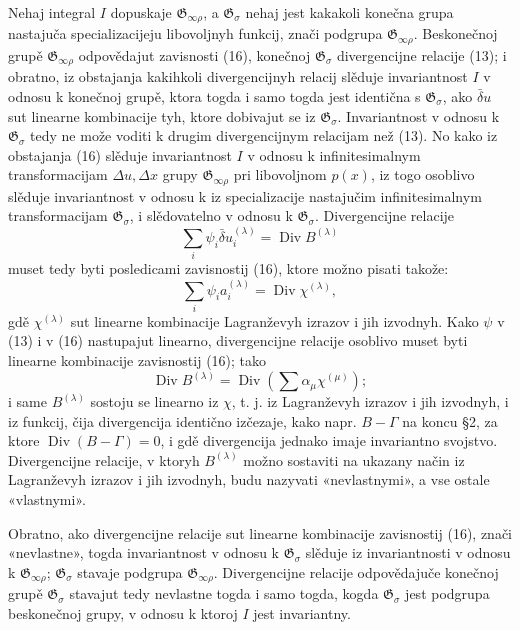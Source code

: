 \documentclass[11pt]{article}
\providecommand{\G}{\mathfrak G}
\providecommand{\D}{\Delta}
\DeclareMathOperator{\Div}{Div}
\providecommand{\bd}{\bar{\delta}}
\begin{document}
Nehaj integral \(I\) dopuskaje \(\G_{\infty\rho}\), a \(\G_\sigma\) nehaj jest kakakoli konečna grupa nastajuča specializacijeju libovoljnyh funkcij, znači podgrupa \(\G_{\infty\rho}\). Beskonečnoj grupě \(\G_{\infty\rho}\) odpovědajut zavisnosti (16), konečnoj \(\G_\sigma\) divergencijne relacije (13); i obratno, iz obstajanja kakihkoli divergencijnyh relacij slěduje invariantnost \(I\) v odnosu k konečnoj grupě, ktora togda i samo togda jest identična s \(\G_\sigma\), ako \(\bd u\) sut linearne kombinacije tyh, ktore dobivajut se iz \(\G_\sigma\). Invariantnost v odnosu k \(\G_\sigma\) tedy ne može voditi k drugim divergencijnym relacijam než (13). No kako iz obstajanja (16) slěduje invariantnost \(I\) v odnosu k infinitesimalnym transformacijam \(\D u,\D x\) grupy \(\G_{\infty\rho}\) pri libovoljnom \(p(x)\), iz togo osoblivo slěduje invariantnost v odnosu k iz specializacije nastajučim infinitesimalnym transformacijam \(\G_\sigma\), i slědovatelno v odnosu k \(\G_\sigma\). Divergencijne relacije
\[
\sum_i\psi_i\bd u_i^{(\lambda)}=\Div B^{(\lambda)}
\]
muset tedy byti posledicami zavisnostij (16), ktore možno pisati takože:
\[
\sum_i\psi_i a_i^{(\lambda)}=\Div\chi^{(\lambda)},
\]
gdě \(\chi^{(\lambda)}\) sut linearne kombinacije Lagranževyh izrazov i jih izvodnyh. Kako \(\psi\) v (13) i v (16) nastupajut linearno, divergencijne relacije osoblivo muset byti linearne kombinacije zavisnostij (16); tako
\[
\Div B^{(\lambda)}=\Div\left(\sum \alpha_\mu\chi^{(\mu)}\right);
\]
i same \(B^{(\lambda)}\) sostoju se linearno iz \(\chi\), t. j. iz Lagranževyh izrazov i jih izvodnyh, i iz funkcij, čija divergencija identično izčezaje, kako napr. \(B-\Gamma\) na koncu \S{}2, za ktore \(\Div(B-\Gamma)=0\), i gdě divergencija jednako imaje invariantno svojstvo. Divergencijne relacije, v ktoryh \(B^{(\lambda)}\) možno sostaviti na ukazany način iz Lagranževyh izrazov i jih izvodnyh, budu nazyvati «nevlastnymi», a vse ostale «vlastnymi».

Obratno, ako divergencijne relacije sut linearne kombinacije zavisnostij (16), znači «nevlastne», togda invariantnost v odnosu k \(\G_\sigma\) slěduje iz invariantnosti v odnosu k \(\G_{\infty\rho}\); \(\G_\sigma\) stavaje podgrupa \(\G_{\infty\rho}\). Divergencijne relacije odpovědajuče konečnoj grupě \(\G_\sigma\) stavajut tedy nevlastne togda i samo togda, kogda \(\G_\sigma\) jest podgrupa beskonečnoj grupy, v odnosu k ktoroj \(I\) jest invariantny.
\end{document}
